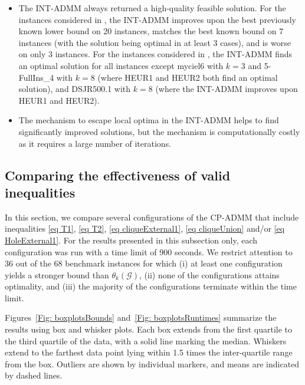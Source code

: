 \documentclass[11pt, a4paper]{article}
\newcommand{\mc}{\mathcal}
\begin{document}
\begin{itemize}
    \item The INT-ADMM always returned a high-quality feasible solution. For the instances considered in \cite{Campelo2010ILPLagr}, the INT-ADMM improves upon the best previously known lower bound on 20 instances, matches the best known bound on 7 instances (with the solution being optimal in at least 3 cases), and is worse on only 3 instances.
    For the instances considered in \cite{Januschowski2011ILPSym}, the INT-ADMM finds an optimal solution for all instances except myciel6 with $k = 3$ and 5-FullIns\_4 with $k=8$ (where HEUR1 and HEUR2 both find an optimal solution), and  DSJR500.1 with $k = 8$ (where the INT-ADMM improves upon HEUR1 and HEUR2).
    \item The mechanism to escape local optima in the INT-ADMM helps to find significantly improved solutions, but the mechanism is computationally costly as it requires a large number of iterations.
\end{itemize}

\subsection{Comparing the effectiveness of valid inequalities} \label{Sec: Effect of valid inequalities}
In this section, we compare several configurations of the CP-ADMM that include inequalities \eqref{eq T1}, \eqref{eq T2}, \eqref{eq cliqueExternal1}, \eqref{eq cliqueUnion} and/or \eqref{eq HoleExternal1}.
For the results presented in this subsection only, each configuration was run with a time limit of 900 seconds.
We restrict attention to 36 out of the 68 benchmark instances for which (i) at least one configuration yields a stronger bound than $\theta_k(\mc{G})$, (ii) none of the configurations attains optimality, and (iii) the majority of the configurations terminate within the time limit.

Figures~\ref{Fig: boxplotsBounds} and~\ref{Fig: boxplotsRuntimes} summarize the results using box and whisker plots. 
Each box extends from the first quartile to the third quartile of the data, with a solid line marking the median. Whiskers extend to the farthest data point lying within 1.5 times the inter-quartile range from the box. 
Outliers are shown by individual markers, and means are indicated by dashed lines.
\end{document}
